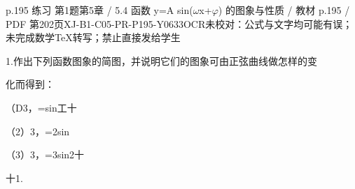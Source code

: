 \begin{bankitem}{p.195 练习 第1题}{第5章 / 5.4 函数 y=A sin(\ensuremath{\omega}x+\ensuremath{\varphi}) 的图象与性质 / 教材 p.195 / PDF 第202页}{XJ-B1-C05-PR-P195-Y0633}{OCR未校对：公式与文字均可能有误；未完成数学TeX转写；禁止直接发给学生}
\begin{ocrdraft}
\par
1.作出下列函数图象的简图，并说明它们的图象可由正弦曲线做怎样的变
\par
化而得到：
\par
（D3，=sin工十
\par
（2）3，=2sin
\par
（3）3，=3sin2十
\par
十1.
\end{ocrdraft}
\end{bankitem}
